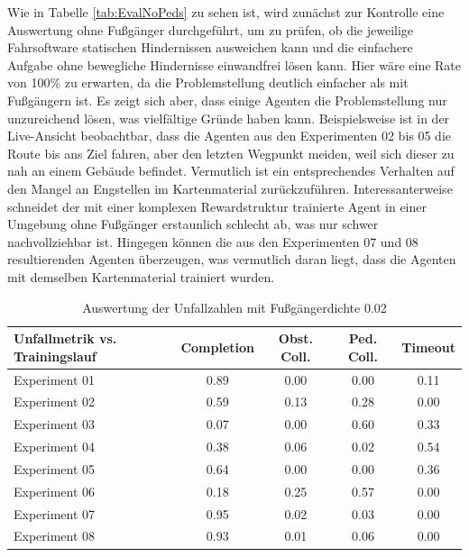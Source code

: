 Wie in Tabelle \ref{tab:EvalNoPeds} zu sehen ist, wird zunächst zur Kontrolle eine Auswertung
ohne Fußgänger durchgeführt, um zu prüfen, ob die jeweilige Fahrsoftware statischen Hindernissen
ausweichen kann und die einfachere Aufgabe ohne bewegliche Hindernisse einwandfrei lösen kann.
Hier wäre eine Rate von 100\% zu erwarten, da die Problemstellung deutlich einfacher als mit
Fußgängern ist. Es zeigt sich aber, dass einige Agenten die Problemstellung nur unzureichend
lösen, was vielfältige Gründe haben kann. Beispielsweise
ist in der Live-Ansicht beobachtbar, dass die Agenten aus den Experimenten 02 bis 05 die Route
bis ans Ziel fahren, aber den letzten Wegpunkt meiden, weil sich dieser zu nah an einem Gebäude
befindet. Vermutlich ist ein entsprechendes Verhalten auf den Mangel an Engstellen
im Kartenmaterial zurückzuführen. Interessanterweise schneidet der mit einer komplexen
Rewardstruktur trainierte Agent in einer Umgebung ohne Fußgänger erstaunlich schlecht ab,
was nur schwer nachvollziehbar ist. Hingegen können die aus den Experimenten 07 und 08
resultierenden Agenten überzeugen, was vermutlich daran liegt, dass die Agenten
mit demselben Kartenmaterial trainiert wurden.\\

\begin{table}[h]
\centering
\begin{tabular}{ |p{3cm}||c|c|c|c| }
 \hline
 Unfallmetrik vs. Trainingslauf & Completion & Obst. Coll. & Ped. Coll. & Timeout \\
 \hline \hline
 Experiment 01 & 0.89 & 0.00 & 0.00 & 0.11 \\ \hline
 Experiment 02 & 0.59 & 0.13 & 0.28 & 0.00 \\ \hline
 Experiment 03 & 0.07 & 0.00 & 0.60 & 0.33 \\ \hline
 Experiment 04 & 0.38 & 0.06 & 0.02 & 0.54 \\ \hline
 Experiment 05 & 0.64 & 0.00 & 0.00 & 0.36 \\ \hline
 Experiment 06 & 0.18 & 0.25 & 0.57 & 0.00 \\ \hline
 Experiment 07 & 0.95 & 0.02 & 0.03 & 0.00 \\ \hline
 Experiment 08 & 0.93 & 0.01 & 0.06 & 0.00 \\
 \hline
\end{tabular}
\caption{Auswertung der Unfallzahlen mit Fußgängerdichte 0.02}
 \label{tab:EvalFewPeds}
\end{table}

